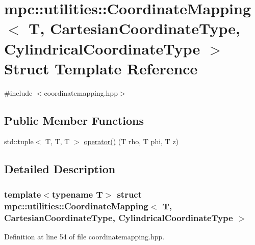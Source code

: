 \hypertarget{structmpc_1_1utilities_1_1_coordinate_mapping_3_01_t_00_01_cartesian_coordinate_type_00_01_cylindrical_coordinate_type_01_4}{}\section{mpc\+:\+:utilities\+:\+:Coordinate\+Mapping$<$ T, Cartesian\+Coordinate\+Type, Cylindrical\+Coordinate\+Type $>$ Struct Template Reference}
\label{structmpc_1_1utilities_1_1_coordinate_mapping_3_01_t_00_01_cartesian_coordinate_type_00_01_cylindrical_coordinate_type_01_4}


{\ttfamily \#include $<$coordinatemapping.\+hpp$>$}

\subsection*{Public Member Functions}
\begin{DoxyCompactItemize}
\item 
std\+::tuple$<$ T, T, T $>$ \mbox{\hyperlink{structmpc_1_1utilities_1_1_coordinate_mapping_3_01_t_00_01_cartesian_coordinate_type_00_01_cylindrical_coordinate_type_01_4_a72140571d694e8eb77e72509ce827c92}{operator()}} (T rho, T phi, T z)
\end{DoxyCompactItemize}


\subsection{Detailed Description}
\subsubsection*{template$<$typename T$>$\newline
struct mpc\+::utilities\+::\+Coordinate\+Mapping$<$ T, Cartesian\+Coordinate\+Type, Cylindrical\+Coordinate\+Type $>$}



Definition at line 54 of file coordinatemapping.\+hpp.



